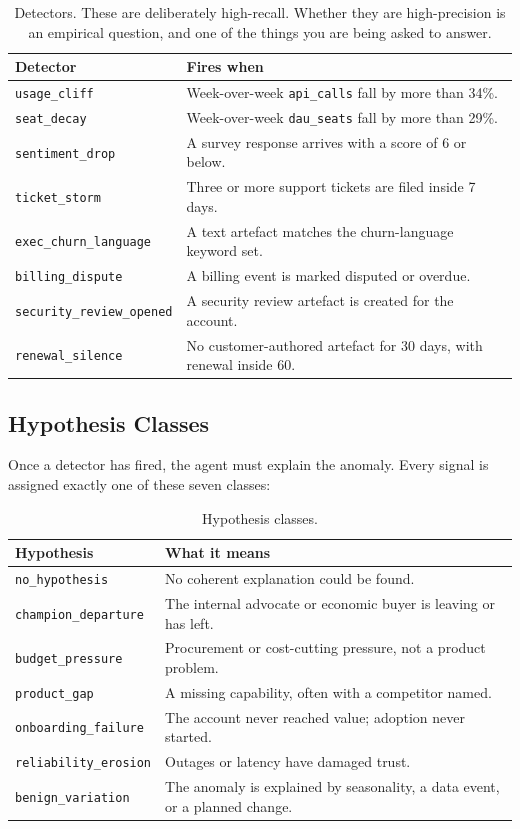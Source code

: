 \documentclass[11pt, a4paper]{article}
\begin{document}
\begin{table}[h]
\centering
\small
\begin{tabular}{lp{9.5cm}}
\toprule
\textbf{Detector} & \textbf{Fires when} \\
\midrule
\texttt{usage\_cliff} & Week-over-week \texttt{api\_calls} fall by more than 34\%. \\
\texttt{seat\_decay} & Week-over-week \texttt{dau\_seats} fall by more than 29\%. \\
\texttt{sentiment\_drop} & A survey response arrives with a score of 6 or below. \\
\texttt{ticket\_storm} & Three or more support tickets are filed inside 7 days. \\
\texttt{exec\_churn\_language} & A text artefact matches the churn-language keyword set. \\
\texttt{billing\_dispute} & A billing event is marked disputed or overdue. \\
\texttt{security\_review\_opened} & A security review artefact is created for the account. \\
\texttt{renewal\_silence} & No customer-authored artefact for 30 days, with renewal inside 60. \\
\bottomrule
\end{tabular}
\caption{Detectors. These are deliberately high-recall. Whether they are high-precision is an empirical question, and one of the things you are being asked to answer.}
\end{table}

\subsection{Hypothesis Classes}

Once a detector has fired, the agent must explain the anomaly. Every signal is assigned exactly one of these seven classes:

\begin{table}[h]
\centering
\begin{tabular}{lp{9cm}}
\toprule
\textbf{Hypothesis} & \textbf{What it means} \\
\midrule
\texttt{no\_hypothesis} & No coherent explanation could be found. \\
\texttt{champion\_departure} & The internal advocate or economic buyer is leaving or has left. \\
\texttt{budget\_pressure} & Procurement or cost-cutting pressure, not a product problem. \\
\texttt{product\_gap} & A missing capability, often with a competitor named. \\
\texttt{onboarding\_failure} & The account never reached value; adoption never started. \\
\texttt{reliability\_erosion} & Outages or latency have damaged trust. \\
\texttt{benign\_variation} & The anomaly is explained by seasonality, a data event, or a planned change. \\
\bottomrule
\end{tabular}
\caption{Hypothesis classes.}
\end{table}
\end{document}
